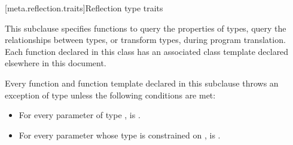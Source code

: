 [meta.reflection.traits]{Reflection type traits}

\pnum
This subclause specifies  functions to
query the properties of types,
query the relationships between types, or
transform types,
during program translation.
Each  function declared in this class
has an associated class template declared elsewhere in this document.

\pnum
Every function and function template declared in this subclause
throws an exception of type 
unless the following conditions are met:
\begin{itemize}
\item
  For every parameter  of type ,
   is .
\item
  For every parameter 
  whose type is constrained on ,
   is .
\end{itemize}


